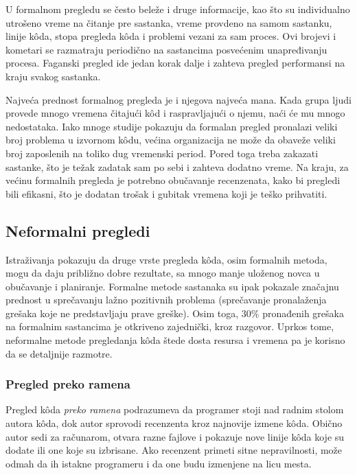 \documentclass[a4paper]{article}
\begin{document}
  U formalnom pregledu se često beleže i druge informacije, kao što su individualno utrošeno vreme na čitanje pre sastanka, vreme provdeno na samom sastanku, linije kôda, stopa pregleda kôda i problemi vezani za sam proces. \cite{ibm}  Ovi brojevi i kometari se razmatraju periodično na sastancima posvećenim unapređivanju procesa. Faganski pregled ide jedan korak dalje i zahteva pregled performansi na kraju svakog sastanka.
  
  Najveća prednost formalnog pregleda je i njegova najveća mana. Kada grupa ljudi provede mnogo vremena čitajući kôd i raspravljajući o njemu, naći će mu mnogo nedostataka. Iako mnoge studije pokazuju da formalan pregled pronalazi veliki broj problema u izvornom kôdu, većina organizacija ne može da obaveže veliki broj zaposlenih na toliko dug vremenski period. Pored toga treba zakazati sastanke, što je težak zadatak sam po sebi i zahteva dodatno vreme. Na kraju, za većinu formalnih pregleda je potrebno obučavanje recenzenata, kako bi pregledi bili efikasni, što je dodatan trošak i gubitak vremena koji je teško prihvatiti. \cite{bkspcr}
    

  \subsection{Neformalni pregledi}
  Istraživanja pokazuju da druge vrste pregleda kôda, osim formalnih metoda, mogu da daju približno dobre rezultate, sa mnogo manje uloženog novca u obučavanje i planiranje. Formalne metode sastanaka su ipak pokazale značajnu prednost u sprečavanju lažno pozitivnih problema 
  (sprečavanje \sloppy pronalaženja grešaka koje ne predstavljaju prave greške). Osim toga, 30\% pronađenih grešaka na formalnim sastancima je otkriveno zajednički, kroz razgovor.  \cite{Johnson98doesevery} Uprkos tome, neformalne metode pregledanja kôda štede dosta resursa i vremena pa je korisno da se detaljnije razmotre.
      
    \subsubsection{Pregled preko ramena}
    Pregled kôda \textit{preko ramena} podrazumeva da programer stoji nad radnim stolom autora kôda, dok autor sprovodi recenzenta kroz najnovije izmene kôda. Obično autor sedi za računarom, otvara razne fajlove i pokazuje nove linije kôda koje su dodate ili one koje su izbrisane. Ako recenzent primeti sitne nepravilnosti, može odmah da ih istakne programeru i da one budu izmenjene na licu mesta.
    
\end{document}
